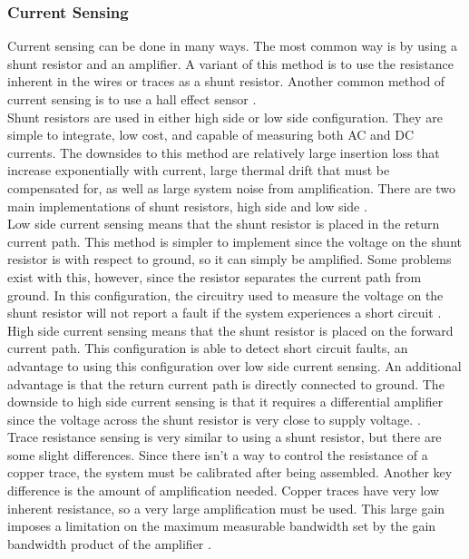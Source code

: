 \subsubsection{Current Sensing}
Current sensing can be done in many ways. The most common way is by using a shunt resistor and an amplifier. A variant of this method is to use the resistance inherent in the wires or traces as a shunt resistor. Another common method of current sensing is to use a hall effect sensor \cite{Current_Sensing}. \\
\newline
Shunt resistors are used in either high side or low side configuration. They are simple to integrate, low cost, and capable of measuring both AC and DC currents. The downsides to this method are relatively large insertion loss that increase exponentially with current, large thermal drift that must be compensated for, as well as large system noise from amplification. There are two main implementations of shunt resistors, high side and low side \cite{Current_Sensing}. \\
\newline
Low side current sensing means that the shunt resistor is placed in the return current path. This method is simpler to implement since the voltage on the shunt resistor is with respect to ground, so it can simply be amplified. Some problems exist with this, however, since the resistor separates the current path from ground. In this configuration, the circuitry used to measure the voltage on the shunt resistor will not report a fault if the system experiences a short circuit \cite{Current_Sensing}. \\
\newline 
High side current sensing means that the shunt resistor is placed on the forward current path. This configuration is able to detect short circuit faults, an advantage to using this configuration over low side current sensing. An additional advantage is that the return current path is directly connected to ground. The downside to high side current sensing is that it requires a differential amplifier since the voltage across the shunt resistor is very close to supply voltage. \cite{Current_Sensing}. \\
\newline
Trace resistance sensing is very similar to using a shunt resistor, but there are some slight differences. Since there isn't a way to control the resistance of a copper trace, the system must be calibrated after being assembled. Another key difference is the amount of amplification needed. Copper traces have very low inherent resistance, so a very large amplification must be used. This large gain imposes a limitation on the maximum measurable bandwidth set by the gain bandwidth product of the amplifier \cite{Current_Sensing}. \\
